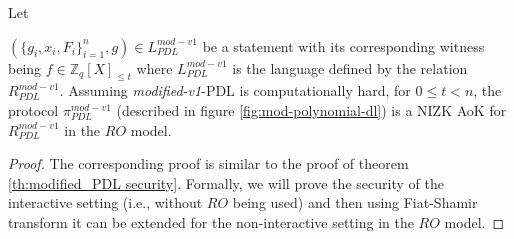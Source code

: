 \begin{theorem}\label{th:modified_v1_PDL security}
  Let\par $(\{g_i,x_i,F_i\}_{i=1}^n,g)\in L_{PDL}^{mod-v1}$ be a statement 
  with its corresponding witness being $f\in\mathbb{Z}_q[X]_{\leq t}$ where $L_{PDL}^{mod-v1}$ is the 
  language defined by the relation $R_{PDL}^{mod-v1}$. Assuming \textit{modified-v1}-PDL is computationally hard, for 
  $0\leq t<n$, the protocol $\pi_{PDL}^{mod-v1}$ (described in figure \ref{fig:mod-polynomial-dl}) is a 
  NIZK AoK for $R_{PDL}^{mod-v1}$ in  the $RO$ model.
\end{theorem}
\begin{proof}
  The corresponding proof is similar to the proof of theorem \ref{th:modified_PDL security}. 
  Formally, we will prove the security of the interactive setting (i.e., without $RO$ being used) and then 
  using Fiat-Shamir transform it can be extended for the non-interactive setting in the $RO$ model. 


\end{proof}

